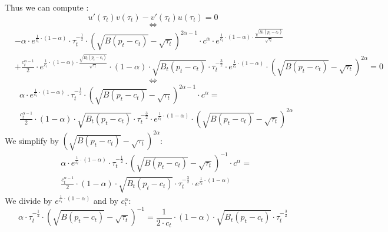 \documentclass{article}
\begin{document}
Thus we can compute : 
\begin{equation*}
    u'(\tau_{t})v(\tau_{t})-v'(\tau_{t})u(\tau_{t})=0
\end{equation*}
$$\iff$$
\begin{equation*}
    \begin{split}
    & -\alpha\cdot e^{\frac{1}{c_{t}}\cdot\left(1-\alpha\right)}\cdot \tau_{t}^{-\frac{1}{2}}\cdot \left(\sqrt{B(p_{t}-c_{t})}-\sqrt{\tau_{t}}\right)^{2\alpha-1} \cdot  c^{\alpha}\cdot e^{\frac{1}{c_{t}}\cdot(1-\alpha)\cdot\frac{\sqrt{B_{t}(p_{t}-c_{t})}}{\sqrt{\tau_{t}}}} \\
    & +\frac{c_{t}^{\alpha-1}}{2}\cdot e^{\frac{1}{c_{t}}\cdot(1-\alpha)\cdot\frac{\sqrt{B_{t}(p_{t}-c_{t})}}{\sqrt{\tau_{t}}}}\cdot (1-\alpha)\cdot\sqrt{B_{t}(p_{t}-c_{t})}\cdot\tau_{t}^{-\frac{3}{2}}\cdot e^{\frac{1}{c_{t}}\cdot\left(1-\alpha\right)}\cdot\left(\sqrt{B(p_{t}-c_{t})}-\sqrt{\tau_{t}}\right)^{2\alpha}=0
    \end{split}
\end{equation*}
$$\iff$$
\begin{equation*}
    \begin{split}
    & \alpha\cdot e^{\frac{1}{c_{t}}\cdot\left(1-\alpha\right)}\cdot \tau_{t}^{-\frac{1}{2}}\cdot \left(\sqrt{B(p_{t}-c_{t})}-\sqrt{\tau_{t}}\right)^{2\alpha-1} \cdot  c^{\alpha} = \\
    & \frac{c_{t}^{\alpha-1}}{2}\cdot (1-\alpha)\cdot\sqrt{B_{t}(p_{t}-c_{t})}\cdot\tau_{t}^{-\frac{3}{2}}\cdot e^{\frac{1}{c_{t}}\cdot\left(1-\alpha\right)}\cdot\left(\sqrt{B(p_{t}-c_{t})}-\sqrt{\tau_{t}}\right)^{2\alpha}
    \end{split}
\end{equation*}
We simplify by $\left(\sqrt{B(p_{t}-c_{t})}-\sqrt{\tau_{t}}\right)^{2\alpha}$:
\begin{equation*}
    \begin{split}
    & \alpha\cdot e^{\frac{1}{c_{t}}\cdot\left(1-\alpha\right)}\cdot \tau_{t}^{-\frac{1}{2}}\cdot \left(\sqrt{B(p_{t}-c_{t})}-\sqrt{\tau_{t}}\right)^{-1} \cdot  c^{\alpha} = \\
    & \frac{c_{t}^{\alpha-1}}{2}\cdot (1-\alpha)\cdot\sqrt{B_{t}(p_{t}-c_{t})}\cdot\tau_{t}^{-\frac{3}{2}}\cdot e^{\frac{1}{c_{t}}\cdot\left(1-\alpha\right)}
    \end{split}
\end{equation*}
We divide by $e^{\frac{1}{c_{t}}\cdot\left(1-\alpha\right)}$ and by $c_{t}^{\alpha}$:
\begin{equation*}
    \alpha\cdot \tau_{t}^{-\frac{1}{2}}\cdot \left(\sqrt{B(p_{t}-c_{t})}-\sqrt{\tau_{t}}\right)^{-1} = \frac{1}{2\cdot c_{t}}\cdot (1-\alpha)\cdot\sqrt{B_{t}(p_{t}-c_{t})}\cdot\tau_{t}^{-\frac{3}{2}} 
\end{equation*}
\end{document}
